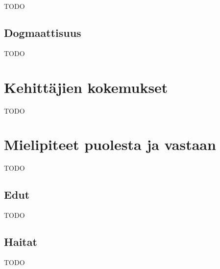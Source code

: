 TODO

\subsection{Dogmaattisuus}

TODO

\section{Kehittäjien kokemukset}

TODO

\section{Mielipiteet puolesta ja vastaan}

TODO

\subsection{Edut}

TODO

\subsection{Haitat}

TODO
